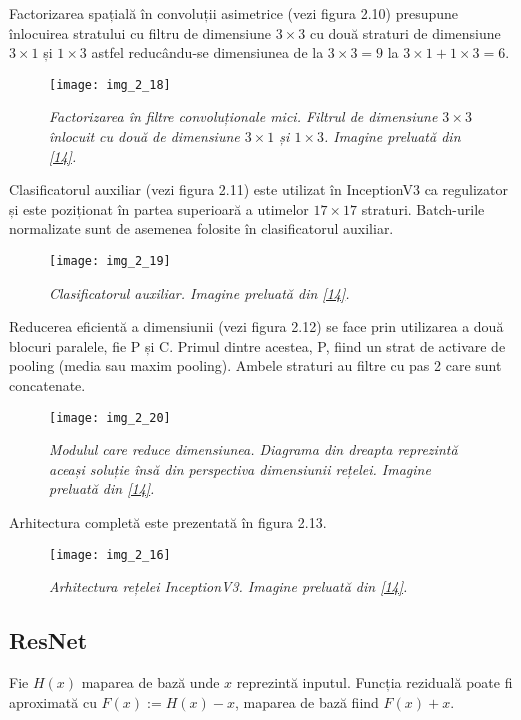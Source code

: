 Factorizarea spațială în convoluții asimetrice (vezi figura 2.10) presupune înlocuirea stratului cu filtru de dimensiune $3 \times 3$ cu două straturi de dimensiune $3 \times 1$ și $1 \times 3$ astfel reducându-se dimensiunea de la $3 \times 3 = 9$ la $3 \times 1 + 1 \times 3 = 6$. 
\begin{figure}[!h]
	\centering
	\texttt{[image: img\_2\_18]}
	\caption[Factorizarea spațială în convoluții asimetrice]{\textit{Factorizarea în filtre convoluționale mici. Filtrul de dimensiune $3 \times 3$ înlocuit cu două de dimensiune $3 \times 1$ și $1 \times 3$.  Imagine preluată din \hyperlink{guideinceptionv3}{[14]}.}}
\end{figure}

Clasificatorul auxiliar (vezi figura 2.11) este utilizat în InceptionV3 ca regulizator și este poziționat în partea superioară a utimelor $17 \times 17$ straturi. Batch-urile normalizate sunt de asemenea folosite în clasificatorul auxiliar.
\begin{figure}[!h]
	\centering
	\texttt{[image: img\_2\_19]}
	\caption[Clasificator auxiliar]{\textit{Clasificatorul auxiliar. Imagine preluată din \hyperlink{guideinceptionv3}{[14]}.}}
\end{figure}

Reducerea eficientă a dimensiunii (vezi figura 2.12) se face prin utilizarea a două blocuri paralele, fie P și C. Primul dintre acestea, P, fiind un strat de activare de pooling (media sau maxim pooling). Ambele straturi au filtre cu pas 2 care sunt concatenate.
\begin{figure}[!h]
	\centering
	\texttt{[image: img\_2\_20]}
	\caption[Reducerea eficientă a dimensiunii]{\textit{Modulul care reduce dimensiunea. Diagrama din dreapta reprezintă aceași soluție însă din perspectiva dimensiunii rețelei. Imagine preluată din \hyperlink{guideinceptionv3}{[14]}.}}
\end{figure}   

Arhitectura completă este prezentată în figura 2.13.
\begin{figure}[!h]
	\centering
	\texttt{[image: img\_2\_16]}
	\caption[Arhitectura InceptionV3]{\textit{Arhitectura rețelei InceptionV3. Imagine preluată din \hyperlink{guideinceptionv3}{[14]}.}}
\end{figure}   

\clearpage
\subsection{ResNet}
Fie $H(x)$ maparea de bază unde $x$ reprezintă inputul. Funcția reziduală poate fi aproximată cu $F(x) := H(x) - x$, maparea de bază fiind $F(x) + x$.

